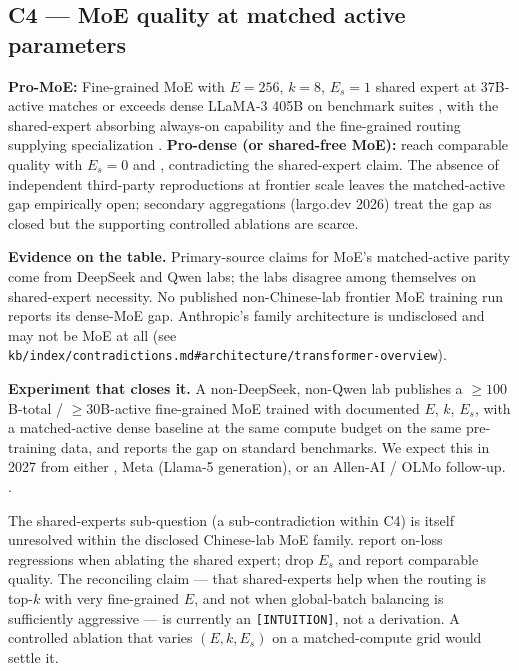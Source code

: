 \subsection{C4 --- MoE quality at matched active parameters}
\label{sec:c-moe}

\textbf{Pro-MoE:} Fine-grained MoE with $E = 256$, $k = 8$, $E_s = 1$
shared expert at 37B-active matches or exceeds dense LLaMA-3 405B on
benchmark suites \citep[abstract]{deepseek-v3}, with the shared-expert
absorbing always-on capability and the fine-grained routing supplying
specialization \citep{deepseekmoe2024}. \textbf{Pro-dense (or
shared-free MoE):} \citet{qwen3} reach comparable quality with $E_s =
0$ and , contradicting the shared-expert
claim. The absence of independent third-party reproductions at
frontier scale leaves the matched-active gap empirically open;
secondary aggregations (largo.dev 2026) treat the gap as closed but
the supporting controlled ablations are scarce.

\textbf{Evidence on the table.} Primary-source claims for MoE's
matched-active parity come from DeepSeek and Qwen labs; the labs
disagree among themselves on shared-expert necessity. No published
non-Chinese-lab frontier MoE training run reports its dense-MoE gap.
Anthropic's  family architecture is undisclosed and may not be
MoE at all
(see \nolinkurl{kb/index/contradictions.md#architecture/transformer-overview}).

\textbf{Experiment that closes it.} A non-DeepSeek, non-Qwen lab
publishes a $\geq 100$B-total / $\geq 30$B-active fine-grained MoE
trained with documented $E$, $k$, $E_s$, with a matched-active dense
baseline at the same compute budget on the same pre-training data, and
reports the gap on standard benchmarks. We expect this in 2027 from
either , Meta (Llama-5 generation), or an Allen-AI / OLMo
follow-up.
.

\begin{contradiction}
The shared-experts sub-question (a sub-contradiction within C4) is
itself unresolved within the disclosed Chinese-lab MoE family.
\citet{deepseek-v3} report on-loss regressions when ablating the shared
expert; \citet{qwen3} drop $E_s$ and report comparable quality. The
reconciling claim --- that shared-experts help when the routing is
top-$k$ with very fine-grained $E$, and not when global-batch balancing
is sufficiently aggressive --- is currently an
\texttt{[INTUITION]}, not a derivation. A controlled ablation that
varies $(E, k, E_s)$ on a matched-compute grid would settle it.
\end{contradiction}

